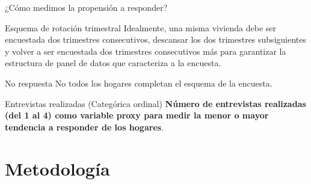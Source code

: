 \documentclass[10pt]{beamer}
\begin{document}
\begin{frame}{¿Cómo medimos la propensión a responder?}

\begin{exampleblock}{Esquema de rotación trimestral}
    Idealmente, una misma vivienda debe ser encuestada dos trimestres consecutivos, descansar los dos trimestres subsiguientes y volver a ser encuestada dos trimestres consecutivos más para garantizar la estructura de panel de datos que caracteriza a la encuesta.
\end{exampleblock}

\downarrow

\begin{exampleblock}{No respuesta}
    No todos los hogares completan el esquema de la encuesta.
\end{exampleblock}

\downarrow

\begin{exampleblock}{Entrevistas realizadas (Categórica ordinal)}
    \textbf{Número de entrevistas realizadas (del 1 al 4) como variable proxy para medir la menor o mayor tendencia a responder de los hogares}.   
\end{exampleblock}

\end{frame}


\section{Metodología}
\end{document}
